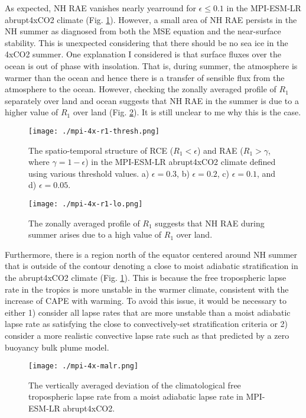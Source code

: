 \documentclass[11pt]{article}
\begin{document}
As expected, NH RAE vanishes nearly yearround for \(\epsilon\le0.1\) in the MPI-ESM-LR abrupt4xCO2 climate (Fig. \ref{fig:org5c1357b}). However, a small area of NH RAE persists in the NH summer as diagnosed from both the MSE equation and the near-surface stability. This is unexpected considering that there should be no sea ice in the 4xCO2 summer. One explanation I considered is that surface fluxes over the ocean is out of phase with insolation. That is, during summer, the atmosphere is warmer than the ocean and hence there is a transfer of sensible flux from the atmosphere to the ocean. However, checking the zonally averaged profile of \(R_1\) separately over land and ocean suggests that NH RAE in the summer is due to a higher value of \(R_1\) over land (Fig. \ref{fig:org5e46ed7}). It is still unclear to me why this is the case.

\begin{figure}[htbp]
\centering
\texttt{[image: ./mpi-4x-r1-thresh.png]}
\caption{\label{fig:org5c1357b}The spatio-temporal structure of RCE (\(R_1<\epsilon\)) and RAE (\(R_1>\gamma\), where \(\gamma=1-\epsilon\)) in the MPI-ESM-LR abrupt4xCO2 climate defined using various threshold values. a) \(\epsilon=0.3\), b) \(\epsilon=0.2\), c) \(\epsilon=0.1\), and d) \(\epsilon=0.05\).}
\end{figure}

\begin{figure}[htbp]
\centering
\texttt{[image: ./mpi-4x-r1-lo.png]}
\caption{\label{fig:org5e46ed7}The zonally averaged profile of \(R_1\) suggests that NH RAE during summer arises due to a high value of \(R_1\) over land.}
\end{figure}

Furthermore, there is a region north of the equator centered around NH summer that is outside of the contour denoting a close to moist adiabatic stratification in the abrupt4xCO2 climate (Fig. \ref{fig:org5c1357b}). This is because the free tropospheric lapse rate in the tropics is more unstable in the warmer climate, consistent with the increase of CAPE with warming. To avoid this issue, it would be necessary to either 1) consider all lapse rates that are more unstable than a moist adiabatic lapse rate as satisfying the close to convectively-set stratification criteria or 2) consider a more realistic convective lapse rate such as that predicted by a zero buoyancy bulk plume model.

\begin{figure}[htbp]
\centering
\texttt{[image: ./mpi-4x-malr.png]}
\caption{\label{fig:orga6bb857}The vertically averaged deviation of the climatological free tropospheric lapse rate from a moist adiabatic lapse rate in MPI-ESM-LR abrupt4xCO2.}
\end{figure}
\end{document}
